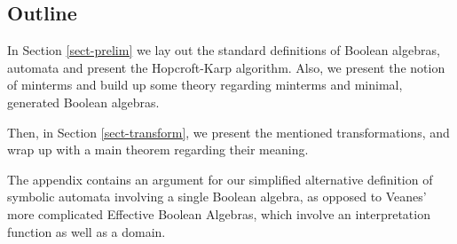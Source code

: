 \subsection*{Outline}

In Section \ref{sect-prelim} we lay out the standard definitions of Boolean algebras, automata and present the Hopcroft-Karp algorithm. Also, we present the notion of minterms and build up some theory regarding minterms and minimal, generated Boolean algebras.

Then, in Section \ref{sect-transform}, we present the mentioned transformations, and wrap up with a main theorem regarding their meaning.

The appendix contains an argument for our simplified alternative definition of symbolic automata involving a single Boolean algebra, as opposed to Veanes' more complicated Effective Boolean Algebras, which involve an interpretation function as well as a domain.



